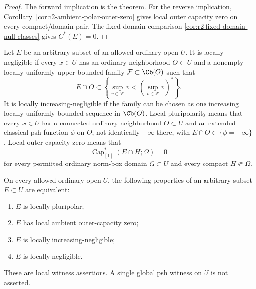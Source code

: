 \begin{proof}
The forward implication is the theorem. For the reverse implication,
Corollary~\ref{cor:r2-ambient-polar-outer-zero} gives local outer
capacity zero on every compact/domain pair. The fixed-domain
comparison \ref{cor:r2-fixed-domain-null-classes} gives $C^*(E)=0$.
\end{proof}

\begin{definition}
\label{def:r2-local-negligibility}
Let $E$ be an arbitrary subset of an allowed ordinary open $U$.
It is locally negligible if every $x\in U$ has an ordinary
neighborhood $O\subset U$ and a nonempty locally uniformly
upper-bounded family $\mathcal F\subset\Cb(O)$ such that
\[
 E\cap O\subset
 \left\{\sup_{v\in\mathcal F}v<
                    \left(\sup_{v\in\mathcal F}v\right)^*\right\}.
\]
It is locally increasing-negligible if the family can be chosen as
one increasing locally uniformly bounded sequence in $\Cb(O)$.
Local pluripolarity means that every $x\in U$ has a connected ordinary
neighborhood $O\subset U$ and an extended classical psh function
$\phi$ on $O$, not identically $-\infty$ there, with
$E\cap O\subset\{\phi=-\infty\}$.
Local outer-capacity zero means that
\[
 \operatorname{Cap}_{[1]}^*(E\cap H;\Omega)=0
\]
for every permitted ordinary norm-box domain $\Omega\subset U$
and every compact $H\Subset\Omega$.
\end{definition}

\begin{corollary}
\label{cor:r2-polar-negligible-equivalence}
On every allowed ordinary open $U$, the following properties of an arbitrary subset
$E\subset U$ are equivalent:
\begin{enumerate}[label=\textup{(\roman*)}]
\item $E$ is locally pluripolar;
\item $E$ has local ambient outer-capacity zero;
\item $E$ is locally increasing-negligible;
\item $E$ is locally negligible.
\end{enumerate}
These are local witness assertions. A single global psh witness on
$U$ is not asserted.
\end{corollary}

